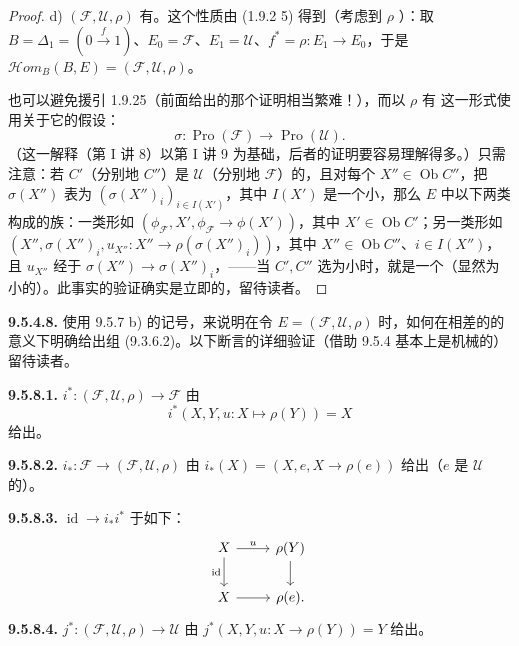 \begin{proof}
d) $(\mathscr F,\mathscr U,\rho)$ 有。这个性质由 (1.9.2 5) 得到（考虑到 $\rho$ ）：取 $B=\Delta_1=(0\xrightarrow{f}1)$、$E_0=\mathscr F$、$E_1=\mathscr U$、$f^*=\rho:E_1\to E_0$，于是 $\mathscr{H}om_B(B,E)=(\mathscr F,\mathscr U,\rho)$。

也可以避免援引 1.9.25（前面给出的那个证明相当繁难！），而以 $\rho$ 有 这一形式使用关于它的假设：
\[
\sigma:\operatorname{Pro}(\mathscr F)\longrightarrow\operatorname{Pro}(\mathscr U).
\]
（这一解释（第 I 讲 8）以第 I 讲 9 为基础，后者的证明要容易理解得多。）只需注意：若 $C'$（分别地 $C''$）是 $\mathscr U$（分别地 $\mathscr F$）的，且对每个 $X''\in\operatorname{Ob}C''$，把 $\sigma(X'')$ 表为 $(\sigma(X'')_i)_{i\in I(X')}$，其中 $I(X')$ 是一个小，那么 $E$ 中以下两类构成的族：一类形如 $(\phi_{\mathscr F},X',\phi_{\mathscr F}\to\phi(X'))$，其中 $X'\in\operatorname{Ob}C'$；另一类形如 $(X'',\sigma(X'')_i,u_{X''}:X''\to\rho(\sigma(X'')_i))$，其中 $X''\in\operatorname{Ob}C''$、$i\in I(X'')$，且 $u_{X''}$ 经于 $\sigma(X'')\to\sigma(X'')_i$，——当 $C',C''$ 选为小时，就是一个（显然为小的）。此事实的验证确实是立即的，留待读者。
\end{proof}
\textbf{9.5.4.8.} 使用 9.5.7 b) 的记号，来说明在令 $E=(\mathscr F,\mathscr U,\rho)$ 时，如何在相差的的意义下明确给出组 (9.3.6.2)。以下断言的详细验证（借助 9.5.4 基本上是机械的）留待读者。

\textbf{9.5.8.1.}  $i^*:(\mathscr F,\mathscr U,\rho)\to\mathscr F$ 由
\[
i^*(X,Y,u:X\mapsto\rho(Y))=X
\]
给出。

\textbf{9.5.8.2.}  $i_*:\mathscr F\to(\mathscr F,\mathscr U,\rho)$ 由 $i_*(X)=(X,e,X\to\rho(e))$ 给出（$e$ 是 $\mathscr U$ 的）。

\textbf{9.5.8.3.}  $\operatorname{id}\to i_*i^*$ 于如下：
\[
\begin{tikzcd}
X\arrow[r,"u"]\arrow[d,"\operatorname{id}"']&\rho(Y)\arrow[d]\\
X\arrow[r]&\rho(e).
\end{tikzcd}
\]
\textbf{9.5.8.4.}  $j^*:(\mathscr F,\mathscr U,\rho)\to\mathscr U$ 由 $j^*(X,Y,u:X\to\rho(Y))=Y$ 给出。

